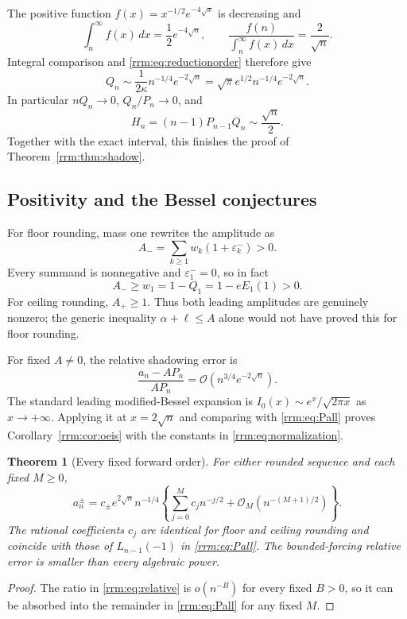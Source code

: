 \documentclass[11pt]{article}
\newtheorem{theorem}{Theorem}[section]
\theoremstyle{remark}\newtheorem{remark}[theorem]{Remark}
\newcommand{\eps}{\varepsilon}
\newcommand{\OO}{\mathcal O}
\begin{document}
The positive function $f(x)=x^{-1/2}e^{-4\sqrt x}$ is decreasing and
\[
 \int_n^\infty f(x)\,dx=\frac12 e^{-4\sqrt n},
 \qquad \frac{f(n)}{\int_n^\infty f(x)\,dx}=\frac2{\sqrt n}.
\]
Integral comparison and \eqref{rrm:eq:reductionorder} therefore give
\begin{equation}\label{rrm:eq:Qasymp}
 Q_n\sim\frac1{2\kappa}n^{-1/4}e^{-2\sqrt n}
 =\sqrt\pi e^{1/2}n^{-1/4}e^{-2\sqrt n}.
\end{equation}
In particular $nQ_n\to0$, $Q_n/P_n\to0$, and
\begin{equation}\label{rrm:eq:Hasymp}
 H_n=(n-1)P_{n-1}Q_n\sim\frac{\sqrt n}{2}.
\end{equation}
Together with the exact interval, this finishes the proof of Theorem~\ref{rrm:thm:shadow}.

\subsection{Positivity and the Bessel conjectures}
For floor rounding, mass one rewrites the amplitude as
\[
 A_-=\sum_{k\ge1}w_k(1+\eps_k^-)>0.
\]
Every summand is nonnegative and $\eps_1^-=0$, so in fact
\begin{equation}\label{rrm:eq:positivity}
 A_-\ge w_1=1-Q_1=1-eE_1(1)>0.
\end{equation}
For ceiling rounding, $A_+\ge1$. Thus both leading amplitudes are genuinely nonzero; the generic inequality $\alpha+\ell\le A$ alone would not have proved this for floor rounding.

For fixed $A\ne0$, the relative shadowing error is
\begin{equation}\label{rrm:eq:relative}
 \frac{a_n-AP_n}{AP_n}=\OO\left(n^{3/4}e^{-2\sqrt n}\right).
\end{equation}
The standard leading modified-Bessel expansion \cite[10.40.1]{dlmf} is
$I_0(x)\sim e^x/\sqrt{2\pi x}$ as $x\to+\infty$. Applying it at $x=2\sqrt n$ and comparing with \eqref{rrm:eq:Pall} proves Corollary~\ref{rrm:cor:oeis} with the constants in \eqref{rrm:eq:normalization}.

\begin{theorem}[Every fixed forward order]\label{rrm:thm:allorders}
For either rounded sequence and each fixed $M\ge0$,
\begin{equation}\label{rrm:eq:allorders}
 a_n^\pm=c_\pm e^{2\sqrt n}n^{-1/4}
 \left\{\sum_{j=0}^M c_jn^{-j/2}
       +\OO_M(n^{-(M+1)/2})\right\}.
\end{equation}
The rational coefficients $c_j$ are identical for floor and ceiling rounding and coincide with those of $L_{n-1}(-1)$ in \eqref{rrm:eq:Pall}. The bounded-forcing relative error is smaller than every algebraic power.
\end{theorem}
\begin{proof}
The ratio in \eqref{rrm:eq:relative} is $o(n^{-B})$ for every fixed $B>0$, so it can be absorbed into the remainder in \eqref{rrm:eq:Pall} for any fixed $M$.
\end{proof}
\end{document}

